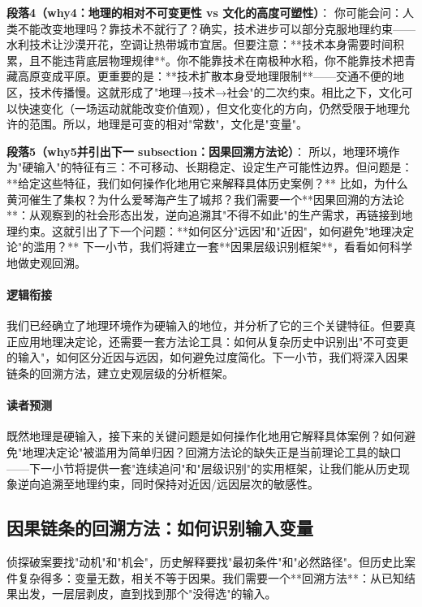 \documentclass[openany, a4paper, 12pt]{book}
\newenvironment{motivation}{
	\vspace{0.5em}
	\begin{tcolorbox}[
		colback=gray!10,           %
		colframe=gray!60,          %
		title=\textit{本章动机 (Motivation)},
		fonttitle=\bfseries,
		arc=0mm,                   %
		leftrule=3mm               %
		]
		\small \itshape %
	}{
	\end{tcolorbox}
	\vspace{1em}
}
\begin{document}
	\textbf{段落4（why4：地理的相对不可变更性 vs 文化的高度可塑性）}：  
	你可能会问：人类不能改变地理吗？靠技术不就行了？确实，技术进步可以部分克服地理约束——水利技术让沙漠开花，空调让热带城市宜居。但要注意：**技术本身需要时间积累，且不能违背底层物理规律**。你不能靠技术在南极种水稻，你不能靠技术把青藏高原变成平原。更重要的是：**技术扩散本身受地理限制**——交通不便的地区，技术传播慢。这就形成了"地理→技术→社会"的二次约束。相比之下，文化可以快速变化（一场运动就能改变价值观），但文化变化的方向，仍然受限于地理允许的范围。所以，地理是可变的相对"常数"，文化是"变量"。
	
	\textbf{段落5（why5并引出下一 subsection：因果回溯方法论）}：  
	所以，地理环境作为"硬输入"的特征有三：不可移动、长期稳定、设定生产可能性边界。但问题是：**给定这些特征，我们如何操作化地用它来解释具体历史案例？** 比如，为什么黄河催生了集权？为什么爱琴海产生了城邦？我们需要一个**因果回溯的方法论**：从观察到的社会形态出发，逆向追溯其"不得不如此"的生产需求，再链接到地理约束。这就引出了下一个问题：**如何区分"远因"和"近因"，如何避免"地理决定论"的滥用？** 下一小节，我们将建立一套**因果层级识别框架**，看看如何科学地做史观回溯。
	
	\paragraph*{逻辑衔接}
	我们已经确立了地理环境作为硬输入的地位，并分析了它的三个关键特征。但要真正应用地理决定论，还需要一套方法论工具：如何从复杂历史中识别出"不可变更的输入"，如何区分近因与远因，如何避免过度简化。下一小节，我们将深入因果链条的回溯方法，建立史观层级的分析框架。

	\paragraph*{读者预测}
	既然地理是硬输入，接下来的关键问题是如何操作化地用它解释具体案例？如何避免"地理决定论"被滥用为简单归因？回溯方法论的缺失正是当前理论工具的缺口——下一小节将提供一套"连续追问"和"层级识别"的实用框架，让我们能从历史现象逆向追溯至地理约束，同时保持对近因/远因层次的敏感性。

	\subsection{因果链条的回溯方法：如何识别输入变量}
	
	\begin{motivation}
		侦探破案要找"动机"和"机会"，历史解释要找"最初条件"和"必然路径"。但历史比案件复杂得多：变量无数，相关不等于因果。我们需要一个**回溯方法**：从已知结果出发，一层层剥皮，直到找到那个"没得选"的输入。
	\end{motivation}
	
\end{document}
